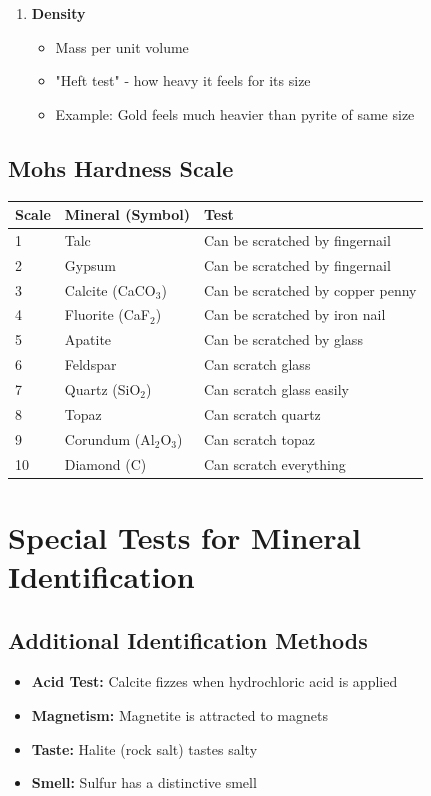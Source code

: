 \documentclass{article}
\begin{document}
\begin{enumerate}
    \item \textbf{Density}
    \begin{itemize}
        \item Mass per unit volume
        \item "Heft test" - how heavy it feels for its size
        \item Example: Gold feels much heavier than pyrite of same size
    \end{itemize}
\end{enumerate}

\subsection{Mohs Hardness Scale}
\begin{tabular}{@{}p{} p{} p{}@{}}
\textbf{Scale} & \textbf{Mineral (Symbol)} & \textbf{Test} \\
\midrule
1 & Talc & Can be scratched by fingernail \\
2 & Gypsum & Can be scratched by fingernail \\
3 & Calcite (CaCO$_3$) & Can be scratched by copper penny \\
4 & Fluorite (CaF$_2$) & Can be scratched by iron nail \\
5 & Apatite & Can be scratched by glass \\
6 & Feldspar & Can scratch glass \\
7 & Quartz (SiO$_2$) & Can scratch glass easily \\
8 & Topaz & Can scratch quartz \\
9 & Corundum (Al$_2$O$_3$) & Can scratch topaz \\
10 & Diamond (C) & Can scratch everything \\
\end{tabular}

\section{Special Tests for Mineral Identification}

\subsection{Additional Identification Methods}
\begin{itemize}
    \item \textbf{Acid Test:} Calcite fizzes when hydrochloric acid is applied
    \item \textbf{Magnetism:} Magnetite is attracted to magnets
    \item \textbf{Taste:} Halite (rock salt) tastes salty
    \item \textbf{Smell:} Sulfur has a distinctive smell
\end{itemize}
\end{document}
